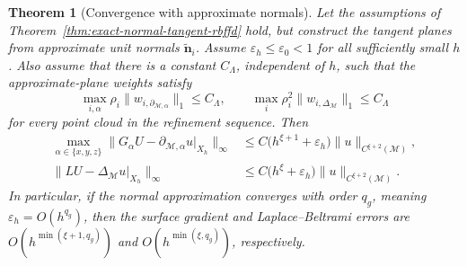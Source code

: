 \documentclass[a4paper,fleqn]{cas-sc}
\newtheorem{theorem}{Theorem}
\begin{document}
\begin{theorem}[Convergence with approximate normals]
\label{thm:approximate-normal-tangent-rbffd}
Let the assumptions of Theorem~\ref{thm:exact-normal-tangent-rbffd} hold, but
construct the tangent planes from approximate unit normals
\(\widetilde{\bm n}_i\).  Assume \(\varepsilon_h\leq\varepsilon_0<1\) for all
sufficiently small \(h\).  Also assume that there is a constant
\(C_\Lambda\), independent of \(h\), such that the approximate-plane weights
satisfy
\begin{equation}
  \max_{i,\alpha}
  \rho_i\|w_{i,\partial_{\mathcal M,\alpha}}\|_1
  \leq C_\Lambda,
  \qquad
  \max_i
  \rho_i^2\|w_{i,\Delta_{\mathcal M}}\|_1
  \leq C_\Lambda
  \label{eq:theory-approximate-uniform-stability}
\end{equation}
for every point cloud in the refinement sequence.  Then
\begin{align}
  \max_{\alpha\in\{x,y,z\}}
  \|G_\alpha U-\partial_{\mathcal M,\alpha}u|_{X_h}\|_\infty
  &\leq C\bigl(h^{\xi+1}+\varepsilon_h\bigr)
  \|u\|_{C^{\xi+2}(\mathcal M)},
  \label{eq:approximate-normal-global-gradient}\\
  \|LU-\Delta_{\mathcal M}u|_{X_h}\|_\infty
  &\leq C\bigl(h^\xi+\varepsilon_h\bigr)
  \|u\|_{C^{\xi+2}(\mathcal M)}.
  \label{eq:approximate-normal-global-laplacian}
\end{align}
In particular, if the normal approximation converges with order \(q_g\),
meaning $\varepsilon_h=O(h^{q_g})$,
then the surface gradient and Laplace--Beltrami errors are $O\!\left(h^{\min(\xi+1,q_g)}\right)$ and $O\!\left(h^{\min(\xi,q_g)}\right)$,
respectively.
\end{theorem}
\end{document}
